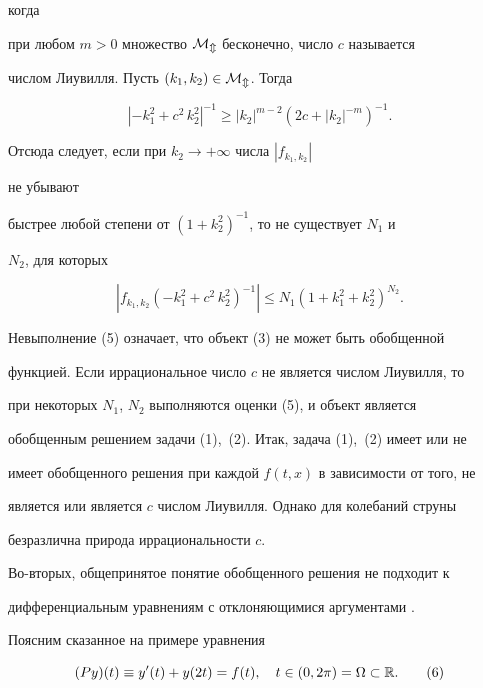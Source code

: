 когда 


при любом $m>0$ множество $\cal M_m$ бесконечно, число $c$ называется 


числом Лиувилля. Пусть $(k_1,k_2)\in\cal M_m$. Тогда 


$$ 


|-k^2_1+c^2\,k^2_2|^{-1}\ge|k_2|^{m-2} 


(2c+|k_2|^{-m})^{-1}. 


$$ 


Отсюда следует, если при $k_2\to+\infty$ числа $|f_{k_1,k_2}|$ 


не убывают 


быстрее любой степени от $(1+k^2_2)^{-1}$, то не существует $N_1$ и 


$N_2$, для которых 


\begin{equation} 


|f_{k_1,k_2}(-k^2_1+c^2\,k^2_2)^{-1}|\le N_1 


(1+k^2_1+k^2_2)^{N_2}. \tag{5}


\end{equation} 


Невыполнение (5) означает, что объект (3) не может быть обобщенной 


функцией. Если иррациональное число $c$ не является числом Лиувилля, то 


при некоторых $N_1$, $N_2$ выполняются оценки (5), и объект является 


обобщенным решением задачи (1),~(2). Итак, задача (1),~(2) имеет или не 


имеет обобщенного решения при каждой $f(t,x)$ в зависимости от того, не 


является или является $c$ числом Лиувилля. Однако для колебаний струны 


безразлична природа иррациональности $c$. 


 


Во-вторых, общепринятое понятие обобщенного решения не подходит к 


дифференциальным уравнениям с отклоняющимися аргументами \cite{3}. 


Поясним сказанное на примере уравнения 


\begin{equation} 


(P y)(t)\equiv y'(t)+y(2t)=f(t),\quad 


t\in(0,2\pi)=\Omega\subset\Bbb R. \tag{6}


\end{equation} 


